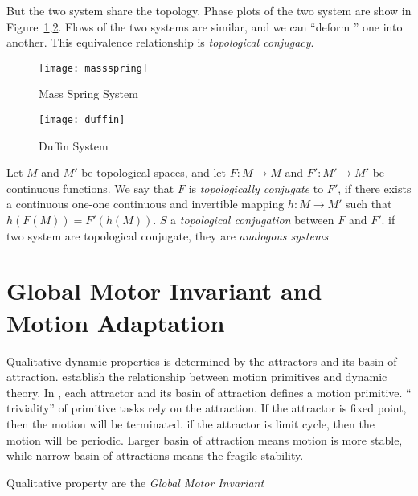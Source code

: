 But the two system share the topology. 
Phase plots of the two system are show in Figure~\ref{fig:msphaseplot},\ref{fig:duffin}.
Flows of the two systems are similar, and we can ``deform '' one into another.
This equivalence relationship is  \emph{topological conjugacy}.

\begin{figure}
\begin{center}
\texttt{[image: massspring]}
\end{center}
\caption{Mass Spring System}
\label{fig:msphaseplot}
\end{figure}

\begin{figure}
\begin{center}
\texttt{[image: duffin]}
\end{center}
\caption{Duffin System}
\label{fig:duffin}
\end{figure}



\begin{mydef}
Let $M$ and $M'$ be topological spaces, and let $F\colon M\to M$ and $F'\colon M'\to M'$
be continuous functions. We say that $F$ is
\emph{topologically conjugate} to $F'$, if there exists a continuous
one-one continuous and invertible mapping $h \colon M\to M'$ such that $h(F(M))=F'(h(M))$.
$S$ a \emph{topological conjugation} between $F$ and $F'$.
if two system are topological conjugate, they are \emph{analogous systems}
\end{mydef}




\section{Global Motor Invariant and Motion Adaptation}
\label{sec:GMIandMA}
Qualitative  dynamic properties is determined by the attractors and its basin of attraction.
\moit establish the relationship between motion primitives and dynamic theory.
In \moit, each attractor and its basin of attraction defines a motion primitive.
 `` triviality'' of primitive tasks rely on the attraction.
If the attractor is fixed point, then the motion will be terminated.
if the attractor is limit cycle, then the motion will be periodic.
Larger basin of attraction means motion is more stable, while narrow basin of attractions means the fragile stability.

Qualitative property are the \emph{Global Motor Invariant}

